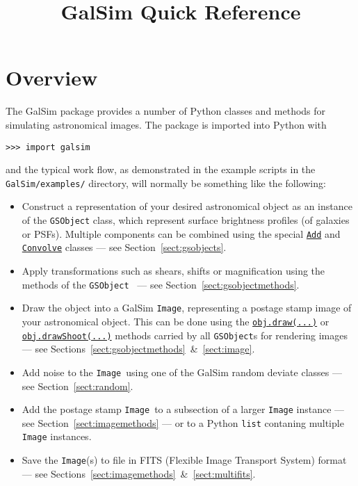 \documentclass[preprint,11pt]{aastex}
\begin{document}
\setlength{\parskip}{2.0ex plus 0.5ex minus 0.5ex}
\setlength{\parindent}{0cm} 

\title{GalSim Quick Reference}

\tableofcontents

\newpage

\section{Overview}


The GalSim package provides a number of Python classes and methods for
simulating astronomical images.  The package is imported into Python with


\texttt{>>> import galsim}

and the typical work flow, as demonstrated in the example scripts in the {\tt
  GalSim/examples/} directory, will normally
be something like the following:
\begin{itemize}

\item Construct a representation of your desired astronomical object
  as an instance of the {\tt GSObject} class, which represent surface brightness profiles (of galaxies or PSFs).  Multiple components can be
  combined using the special
  \href{http://galsim-developers.github.com/GalSim/classgalsim_1_1base_1_1_add.html}{\texttt{Add}}
  and 
  \href{http://galsim-developers.github.com/GalSim/classgalsim_1_1base_1_1_convolve.html}{\texttt{Convolve}}
  classes --- see Section~\ref{sect:gsobjects}.
\item Apply transformations such as shears, shifts or magnification
  using the methods of the \texttt{GSObject}~ --- see Section~\ref{sect:gsobjectmethods}.
\item Draw the object into a GalSim \texttt{Image}, representing a postage
  stamp image of your astronomical object.  This can be done using the
  \href{http://galsim-developers.github.com/GalSim/classgalsim_1_1base_1_1_g_s_object.html#ae0b346a8b438dedbc7f60a52220869d8}{\texttt{obj.draw(...)}}
  or
  \href{http://galsim-developers.github.com/GalSim/classgalsim_1_1base_1_1_g_s_object.html#a42ac334d2840ba3fa832988e998beca0}{\texttt{obj.drawShoot(...)}}
  methods carried by all \texttt{GSObject}s for rendering images --- see
  Sections~\ref{sect:gsobjectmethods}~\&~\ref{sect:image}.
\item Add noise to the \texttt{Image}~using one of the GalSim
  random deviate classes --- see Section~\ref{sect:random}.
\item Add the postage stamp \texttt{Image}~to a subsection of a larger
  \texttt{Image} 
  instance --- see
  Section~\ref{sect:imagemethods} --- or to a Python
  \texttt{list} contaning multiple \texttt{Image} instances.
\item Save the \texttt{Image}(s) to file in FITS (Flexible Image Transport
  System) format --- see Sections~\ref{sect:imagemethods}~\&~\ref{sect:multifits}.
\end{itemize}
\end{document}
